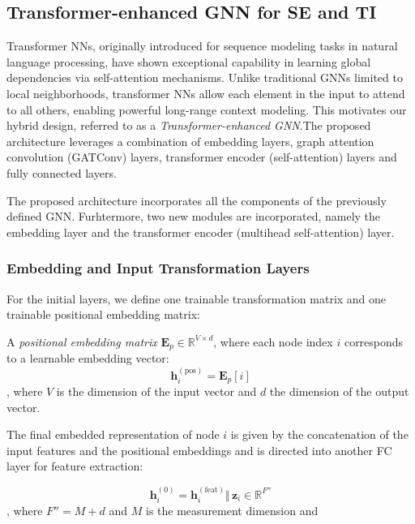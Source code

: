 \documentclass[journal]{IEEEtran}  %
\begin{document}
\subsection{Transformer-enhanced GNN for SE and TI}

Transformer NNs, originally introduced for sequence modeling tasks in natural language processing, have shown exceptional capability in learning global dependencies via self-attention mechanisms. Unlike traditional GNNs limited to local neighborhoods, transformer NNs allow each element in the input to attend to all others, enabling powerful long-range context modeling. This motivates our hybrid design, referred to as a \textit{Transformer-enhanced GNN}.The proposed architecture leverages a combination of embedding layers, graph attention convolution (GATConv) layers, transformer encoder (self-attention) layers and fully connected layers.

The proposed architecture incorporates all the components of the previously defined GNN. Furhtermore, two new modules are incorporated, namely the embedding layer and the transformer encoder (multihead self-attention) layer.

\subsubsection{Embedding and Input Transformation Layers}

For the initial layers, we define one trainable transformation matrix and one trainable positional embedding matrix:

A \textit{positional embedding matrix} \( \mathbf{E}_p \in \mathbb{R}^{V \times d} \), where each node index \( i \) corresponds to a learnable embedding vector:
    \begin{equation}
        \mathbf{h}_i^{(\text{pos})} = \mathbf{E}_p[i]
    \end{equation}, where $V$ is the dimension of the input vector and $d$ the dimension of the output vector.

The final embedded representation of node \( i \) is given by the concatenation of the input features and the positional embeddings and is directed into another FC layer for feature extraction:

\begin{equation}
\label{eq:Embedding concatenation}
    \mathbf{h}_i^{(0)} = \mathbf{h}_i^{(\text{feat})} \Vert \, \mathbf{z}_{i} \in \mathbb{R}^{F''}
\end{equation}, where $F'' = M+d$ and $M$ is the measurement dimension and
\end{document}
